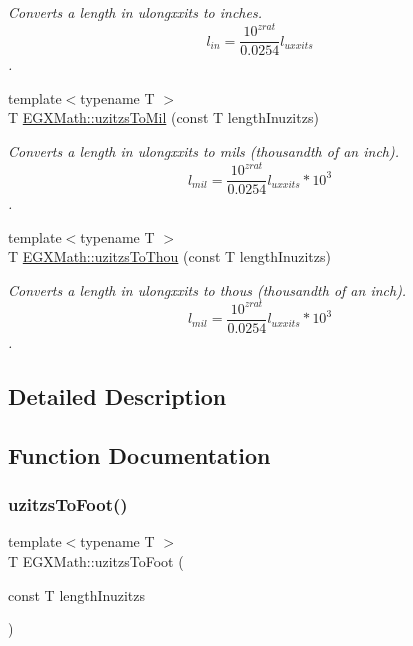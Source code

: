 \begin{DoxyCompactItemize}
\begin{DoxyCompactList}\small\item\em Converts a length in ulongxxits to inches. \[ l_{in}= \frac{10^{zrat}}{0.0254} l_{uxxits} \]. \end{DoxyCompactList}\item 
{\footnotesize template$<$typename T $>$ }\\T \mbox{\hyperlink{group___e_g_x_math-_conversions-_length_conversions-_non-_s_i-uzitzs-_imperial_ga53d4abecb2e7ac39c15c4ef89b9447a9}{E\+G\+X\+Math\+::uzitzs\+To\+Mil}} (const T length\+Inuzitzs)
\begin{DoxyCompactList}\small\item\em Converts a length in ulongxxits to mils (thousandth of an inch). \[ l_{mil}= \frac{10^{zrat}}{0.0254} l_{uxxits} * 10^{3} \]. \end{DoxyCompactList}\item 
{\footnotesize template$<$typename T $>$ }\\T \mbox{\hyperlink{group___e_g_x_math-_conversions-_length_conversions-_non-_s_i-uzitzs-_imperial_gaa11694f9026bf30e29bd716a35c05b4e}{E\+G\+X\+Math\+::uzitzs\+To\+Thou}} (const T length\+Inuzitzs)
\begin{DoxyCompactList}\small\item\em Converts a length in ulongxxits to thous (thousandth of an inch). \[ l_{mil}= \frac{10^{zrat}}{0.0254} l_{uxxits} * 10^{3} \]. \end{DoxyCompactList}\end{DoxyCompactItemize}


\subsection{Detailed Description}


\subsection{Function Documentation}
\mbox{\label{group___e_g_x_math-_conversions-_length_conversions-_non-_s_i-uzitzs-_imperial_gaafdc16c327535a3ea42909a5ebadac71}} 
\subsubsection{\texorpdfstring{uzitzs\+To\+Foot()}{uzitzsToFoot()}}
{\footnotesize\ttfamily template$<$typename T $>$ \\
T E\+G\+X\+Math\+::uzitzs\+To\+Foot (\begin{DoxyParamCaption}\item[{const T}]{length\+Inuzitzs }\end{DoxyParamCaption})}



